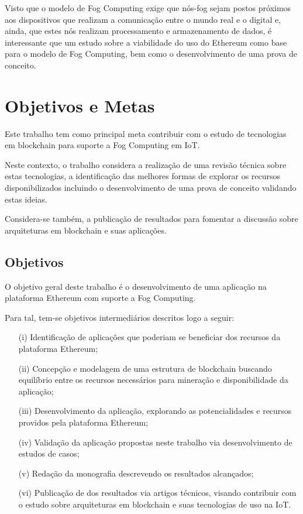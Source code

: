 \documentclass[tcc-proposta]{texufpel}
\begin{document}
Visto que o modelo de Fog Computing exige que nós-fog sejam postos próximos aos dispositivos que realizam a comunicação entre o mundo real e o digital e, ainda, que estes nós realizam processamento e armazenamento de dados, é interessante que um estudo sobre a viabilidade do uso do Ethereum como base para o modelo de Fog Computing, bem como o desenvolvimento de uma prova de conceito.
	
\chapter{Objetivos e Metas}

Este trabalho tem como principal meta contribuir com o estudo de tecnologias em blockchain para suporte  a Fog Computing em IoT.

Neste contexto, o trabalho considera a realização de uma revisão técnica sobre estas tecnologias, a identificação das melhores formas de explorar os recursos disponibilizados incluindo o desenvolvimento de uma prova de conceito validando estas ideias. 

Considera-se também, a publicação de resultados para fomentar a discussão sobre arquiteturas em blockchain e suas aplicações.

\section{Objetivos}

O objetivo geral deste trabalho é o desenvolvimento de uma aplicação na plataforma Ethereum com suporte a Fog Computing. 

Para tal, tem-se objetivos intermediários descritos logo a seguir:

\begin{itemize}

\item[(i)] Identificação de aplicações que poderiam se beneficiar dos recursos da plataforma Ethereum;

\item[(ii)] Concepção e modelagem de uma estrutura de blockchain buscando equilíbrio entre os recursos necessários para mineração e disponibilidade da aplicação;

\item[(iii)] Desenvolvimento da aplicação, explorando as potencialidades e recursos providos pela  plataforma Ethereum;

\item[(iv)] Validação da aplicação propostas neste trabalho via desenvolvimento de estudos de casos;

\item[(v)] Redação da monografia descrevendo os resultados alcançados;

\item[(vi)] Publicação de dos resultados via artigos técnicos, visando contribuir com o estudo sobre arquiteturas em blockchain e suas tecnologias de uso na IoT.

\end{itemize}
\end{document}
